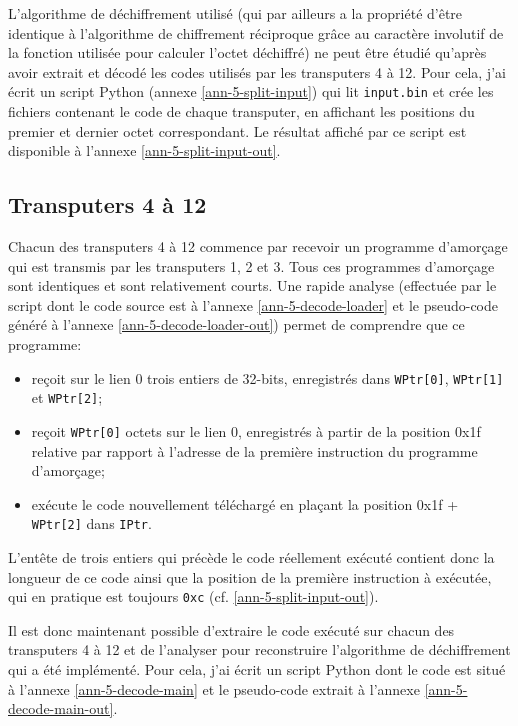 \documentclass[a4paper,10pt]{article}
\begin{document}
L'algorithme de déchiffrement utilisé (qui par ailleurs a la propriété d'être identique à l'algorithme de chiffrement réciproque grâce au caractère involutif de la fonction utilisée pour calculer l'octet déchiffré) ne peut être étudié qu'après avoir extrait et décodé les codes utilisés par les transputers 4 à 12.
Pour cela, j'ai écrit un script Python (annexe \ref{ann-5-split-input}) qui lit \texttt{input.bin} et crée les fichiers contenant le code de chaque transputer, en affichant les positions du premier et dernier octet correspondant.
Le résultat affiché par ce script est disponible à l'annexe \ref{ann-5-split-input-out}.

\subsection{Transputers 4 à 12}

Chacun des transputers 4 à 12 commence par recevoir un programme d'amorçage qui est transmis par les transputers 1, 2 et 3.
Tous ces programmes d'amorçage sont identiques et sont relativement courts.
Une rapide analyse (effectuée par le script dont le code source est à l'annexe \ref{ann-5-decode-loader} et le pseudo-code généré à l'annexe \ref{ann-5-decode-loader-out}) permet de comprendre que ce programme:
\begin{itemize}
  \item reçoit sur le lien 0 trois entiers de 32-bits, enregistrés dans \texttt{WPtr[0]}, \texttt{WPtr[1]} et \texttt{WPtr[2]};
  \item reçoit \texttt{WPtr[0]} octets sur le lien 0, enregistrés à partir de la position 0x1f relative par rapport à l'adresse de la première instruction du programme d'amorçage;
  \item exécute le code nouvellement téléchargé en plaçant la position 0x1f + \texttt{WPtr[2]} dans \texttt{IPtr}.
\end{itemize}

L'entête de trois entiers qui précède le code réellement exécuté contient donc la longueur de ce code ainsi que la position de la première instruction à exécutée, qui en pratique est toujours \texttt{0xc} (cf. \ref{ann-5-split-input-out}).

Il est donc maintenant possible d'extraire le code exécuté sur chacun des transputers 4 à 12 et de l'analyser pour reconstruire l'algorithme de déchiffrement qui a été implémenté.
Pour cela, j'ai écrit un script Python dont le code est situé à l'annexe \ref{ann-5-decode-main} et le pseudo-code extrait à l'annexe \ref{ann-5-decode-main-out}.
\end{document}
